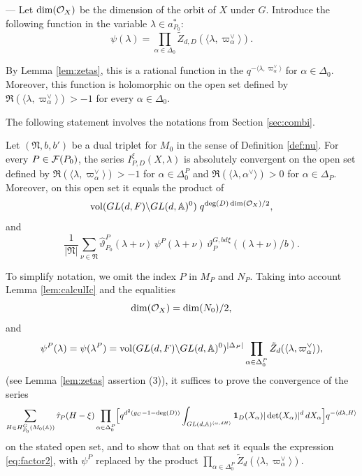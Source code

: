 \begin{paragr} ---\label{S:lapreuveduthm}
Let $\dim(\mathcal{O}_X)$ be the dimension of the orbit of $X$ under $G$. Introduce the following function in the variable $\lambda\in a_{P_0}^*$:
$$\psi(\lambda)=\prod_{\alpha\in \Delta_0}\tilde{Z}_{d,D}(\langle \lambda, \varpi_\alpha^\vee \rangle).$$

By Lemma \ref{lem:zetas}, this is a rational function in the $q^{-\langle \lambda,\varpi_\alpha^\vee \rangle}$ for $\alpha\in \Delta_0$. Moreover, this function is holomorphic on the open set defined by $\Re(\langle \lambda,\varpi_\alpha^\vee \rangle)>-1$ for every $\alpha\in \Delta_0$.

The following statement involves the notations from Section \ref{sec:combi}.

\begin{proposition}
    \label{prop:lecalculpourP} Let $(\mathfrak{N},b,b')$ be a dual triplet for $M_0$ in the sense of Definition \ref{def:nu}. For every $P\in \mathcal{F}(P_0)$, the series $I^{\xi}_{P,D}(X,\lambda)$ is absolutely convergent on the open set defined by $\Re(\langle \lambda, \varpi_\alpha^\vee\rangle)>-1$ for $\alpha\in \Delta_0^P$ and $\Re(\langle \lambda, \alpha^\vee\rangle)>0$ for $\alpha\in \Delta_P$. Moreover, on this open set it equals the product of 
\begin{equation}
      \label{eq:factor1}
      \operatorname{vol}(GL(d,F)\backslash GL(d,\mathbb{A})^0) \; q^{\deg(D) \dim(\mathcal{O}_X)/2},
\end{equation}
and
\begin{equation}
  \label{eq:factor2}
  \frac1{|\mathfrak{N}|}\sum_{\nu \in \mathfrak{N}}   \hat{\vartheta}_{P_0}^P(\lambda+\nu) \, \psi^P(\lambda+\nu)\, \vartheta_{P}^{G,bd\xi}((\lambda+\nu)/b).
\end{equation}
\end{proposition}

\begin{preuve}
To simplify notation, we omit the index $P$ in $M_P$ and $N_P$. Taking into account Lemma \ref{lem:calculIc} and the equalities
$$\dim(\mathcal{O}_X)=\dim(N_0)/2,$$
and
$$\psi^P(\lambda)=\psi(\lambda^P)= \operatorname{vol}(GL(d,F)\backslash GL(d,\mathbb{A})^0)^{|\Delta_P|} \prod_{\alpha\in \Delta_0^P} \tilde{Z}_d(\langle \lambda, \varpi_\alpha^\vee \rangle),$$
(see Lemma \ref{lem:zetas} assertion (3)), it suffices to prove the convergence of the series
\begin{equation}
  \label{eq:laserie}
  \sum_{H\in H_{P_0}^G(M_0(\mathbb{A}))} \hat{\tau}_P(H-\xi) \prod_{\alpha\in \Delta_0^P} \Bigl[  q^{d^2(g_C-1-\deg(D))}  \int_{ GL(d,\mathbb{A})^{\langle \alpha, dH\rangle}}\mathbf{1}_D(X_\alpha)|\det(X_\alpha)|^d\, dX_\alpha\Bigr]   q^{-\langle d\lambda, H\rangle}
\end{equation}
on the stated open set, and to show that on that set it equals the expression \eqref{eq:factor2}, with $\psi^P$ replaced by the product $\prod_{\alpha\in \Delta_0^P} \tilde{Z}_d(\langle \lambda, \varpi_\alpha^\vee \rangle)$.


\end{preuve}
\end{paragr}
